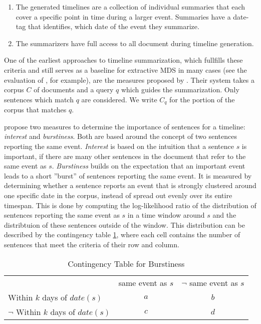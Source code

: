 \documentclass[a4paper,BCOR=10mm]{report}
\numberwithin{lemma}{chapter}
\numberwithin{definition}{chapter}
\begin{document}
\begin{enumerate}
    \item{The generated timelines are a collection of individual summaries that each cover a specific point in time during a larger event. Summaries have a date-tag that identifies, which date of the event they summarize.}
    \item{The summarizers have full access to all document during timeline generation.}
\end{enumerate}


One of the earliest approaches to timeline summarization, which fullfills these criteria and still serves as a baseline for extractive MDS in many cases (see the evaluation of \citet{markert}, for example), are the measures proposed by \citet{chieu}.
Their system takes a corpus $C$ of documents and a query $q$ which guides the summarization. Only sentences which match $q$ are considered. We write $C_q$ for the portion of the corpus that matches $q$.

\citeauthor{chieu} propose two measures to determine the importance of sentences for a timeline: \textit{interest} and \textit{burstiness}.
Both are based around the concept of two sentences reporting the same event. \textit{Interest} is based on the intuition that a sentence $s$ is important, if there are many other sentences in the document that refer to the same event as $s$. \textit{Burstiness} builds on the expectation that an important event leads to a short ''burst'' of sentences reporting the same event.
It is measured by determining whether a sentence reports an event that is strongly clustered around one specific date in the corpus, instead of spread out evenly over its entire timespan. This is done by computing the log-likelihood ratio of the distribution of sentences reporting the same event as $s$ in a time window around $s$ and the distribtuion of these sentences outside of the window.
This distribution can be described by the contingency table \ref{tab:chieu}, where each cell contains the number of sentences that meet the criteria of their row and column.

\begin{table}
\begin{tabular}{|l|c|c|}
\hline
& same event as $s$ & $\lnot$ same event as $s$ \\
Within $k$ days of $\mathit{date}(s)$ & $a$ & $b$ \\
$\lnot$ Within $k$ days of $\mathit{date}(s)$ & $c$ & $d$ \\
\hline
\end{tabular}
\caption{Contingency Table for Burstiness}
\label{tab:chieu}
\end{table}
\end{document}
